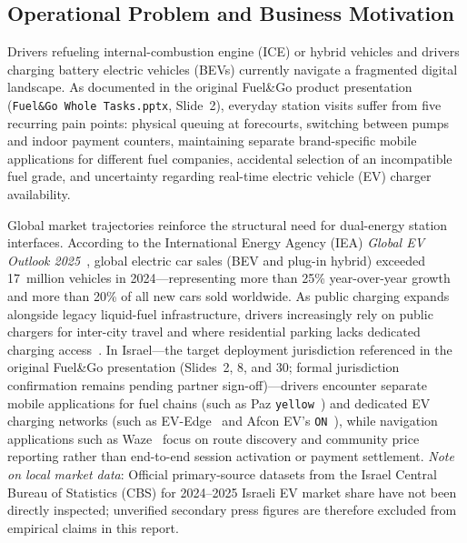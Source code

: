 

\subsection{Operational Problem and Business Motivation}
\label{sec:intro-motivation}

Drivers refueling internal-combustion engine (ICE) or hybrid vehicles and drivers charging battery electric vehicles (BEVs) currently navigate a fragmented digital landscape. As documented in the original Fuel\&Go product presentation (\texttt{Fuel\&Go Whole Tasks.pptx}, Slide~2), everyday station visits suffer from five recurring pain points: physical queuing at forecourts, switching between pumps and indoor payment counters, maintaining separate brand-specific mobile applications for different fuel companies, accidental selection of an incompatible fuel grade, and uncertainty regarding real-time electric vehicle (EV) charger availability.

Global market trajectories reinforce the structural need for dual-energy station interfaces. According to the International Energy Agency (IEA) \emph{Global EV Outlook 2025}~\cite{iea2025gev}, global electric car sales (BEV and plug-in hybrid) exceeded 17~million vehicles in 2024---representing more than 25\% year-over-year growth and more than 20\% of all new cars sold worldwide. As public charging expands alongside legacy liquid-fuel infrastructure, drivers increasingly rely on public chargers for inter-city travel and where residential parking lacks dedicated charging access~\cite{iea2025gev}. In Israel---the target deployment jurisdiction referenced in the original Fuel\&Go presentation (Slides~2, 8, and 30; formal jurisdiction confirmation remains pending partner sign-off)---drivers encounter separate mobile applications for fuel chains (such as Paz \texttt{yellow}~\cite{paz2025yellow}) and dedicated EV charging networks (such as EV-Edge~\cite{evedge2025app} and Afcon EV's \texttt{ON}~\cite{afconev2025on}), while navigation applications such as Waze~\cite{waze2025help,waze2025gas} focus on route discovery and community price reporting rather than end-to-end session activation or payment settlement. \emph{Note on local market data}: Official primary-source datasets from the Israel Central Bureau of Statistics (CBS) for 2024--2025 Israeli EV market share have not been directly inspected; unverified secondary press figures are therefore excluded from empirical claims in this report.

